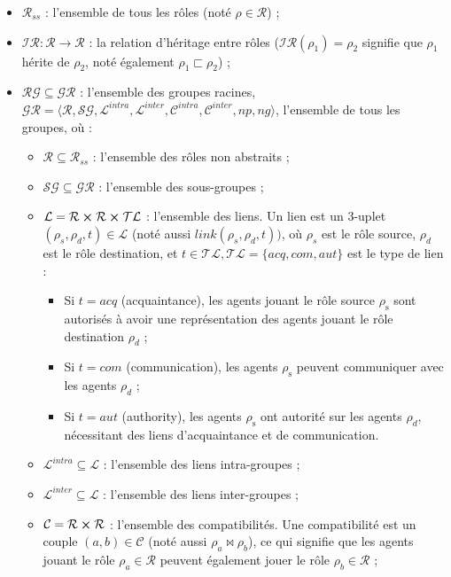 \documentclass[sigconf,anonymous]{aamas}
\begin{document}
\begin{itemize}
    \item $\mathcal{R}_{ss}$ : l'ensemble de tous les rôles (noté $\rho \in \mathcal{R}$) ;
    \item $\mathcal{IR} : \mathcal{R} \rightarrow \mathcal{R}$ : la relation d'héritage entre rôles ($\mathcal{IR}(\rho_1) = \rho_2$ signifie que $\rho_1$ hérite de $\rho_2$, noté également $\rho_1 \sqsubset \rho_2$) ;
    \item $\mathcal{RG} \subseteq \mathcal{GR}$ : l'ensemble des groupes racines, $\mathcal{GR} = \langle \mathcal{R}, \mathcal{SG}, \mathcal{L}^{intra}, \mathcal{L}^{inter}, \mathcal{C}^{intra}, \mathcal{C}^{inter}, np, ng \rangle$, l'ensemble de tous les groupes, où :
          \begin{itemize}
              \item $\mathcal{R} \subseteq \mathcal{R}_{ss}$ : l'ensemble des rôles non abstraits ;
              \item $\mathcal{SG} \subseteq \mathcal{GR}$ : l'ensemble des sous-groupes ;
              \item $\mathcal{L} = \mathcal{R} \cross \mathcal{R} \cross \mathcal{TL}$ : l'ensemble des liens. Un lien est un 3-uplet $(\rho_s,\rho_d,t) \in \mathcal{L}$ (noté aussi $link(\rho_s,\rho_d,t))$, où $\rho_{s}$ est le rôle source, $\rho_{d}$ est le rôle destination, et $t \in \mathcal{TL}, \mathcal{TL} = \{acq, com, aut\}$ est le type de lien :
                    \begin{itemize}
                        \item Si $t = acq$ (acquaintance), les agents jouant le rôle source $\rho_{\mathrm{s}}$ sont autorisés à avoir une représentation des agents jouant le rôle destination $\rho_{d}$ ;
                        \item Si $t = com$ (communication), les agents $\rho_{\mathrm{s}}$ peuvent communiquer avec les agents $\rho_{d}$ ;
                        \item Si $t = aut$ (authority), les agents $\rho_{\mathrm{s}}$ ont autorité sur les agents $\rho_{d}$, nécessitant des liens d'acquaintance et de communication.
                    \end{itemize}
              \item $\mathcal{L}^{intra} \subseteq \mathcal{L}$ : l'ensemble des liens intra-groupes ;
              \item $\mathcal{L}^{inter} \subseteq \mathcal{L}$ : l'ensemble des liens inter-groupes ;
              \item $\mathcal{C} = \mathcal{R} \cross \mathcal{R}$ : l'ensemble des compatibilités. Une compatibilité est un couple $(a,b) \in \mathcal{C}$ (noté aussi $\rho_a \bowtie \rho_b$), ce qui signifie que les agents jouant le rôle $\rho_a \in \mathcal{R}$ peuvent également jouer le rôle $\rho_b \in \mathcal{R}$ ;

\end{itemize}
\end{itemize}
\end{document}
